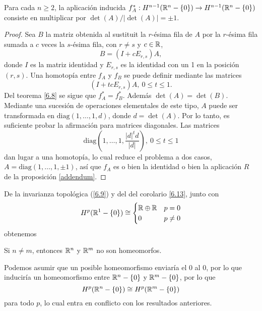 \documentclass[CV.tex]{subfiles}
\begin{document}
\begin{coro}\label{multiplica}
Para cada $n\geq 2$, la aplicación inducida $f_A^*:H^{n-1}(\mathbb{R}^n-\{0\})\to H^{n-1}(\mathbb{R}^n-\{0\})$ consiste en multiplicar por $\det(A)/|\det(A)|=\pm 1$.
\end{coro}
\begin{proof}
Sea $B$ la matriz obtenida al sustituit la $r$-ésima fila de $A$ por la $r$-ésima fila sumada a $c$ veces la $s$-ésima fila, con $r\neq s$ y $c\in\mathbb{R}$,
\[
B=(I+cE_{r,s})A,
\]
donde $I$ es la matriz identidad y $E_{r,s}$ es la identidad con un 1 en la posición $(r,s)$. Una homotopía entre $f_A$ y $f_B$ se puede definir mediante las matrices
\[
(I+tcE_{r,s})A,\ 0\leq t\leq 1.
\]
Del teorema \ref{6.8} se sigue que $f_A^*=f_B^*$. Además $\det(A)=\det(B)$. Mediante una sucesión de operaciones elementales de este tipo, $A$ puede ser transformada en $\mathrm{diag}(1,\dots, 1,d)$, donde $d=\det(A)$. Por lo tanto, es suficiente probar la afirmación para matrices diagonales. Las matrices
\[
\mathrm{diag}(1,\dots, 1, \frac{|d|^td}{|d|}),\ 0\leq t\leq 1
\]
dan lugar a una homotopía, lo cual reduce el problema a dos casos, $A=\mathrm{diag}(1,\dots, 1,\pm 1)$, así que $f_A$ es o bien la identidad o bien la aplicación $R$ de la proposición \ref{addendum}.
\end{proof}

De la invarianza topológica (\ref{6.9}) y del del corolario \ref{6.13}, junto con 
\[
H^p(\mathbb{R}^1-\{0\})\cong\begin{cases}
\mathbb{R}\oplus\mathbb{R} & p=0\\
0 & p\neq 0
\end{cases}
\]
obtenemos

\begin{prop}
Si $n\neq m$, entonces $\mathbb{R}^n$ y $\mathbb{R}^m$ no son homeomorfos. 
\end{prop}
\begin{dem}
Podemos asumir que un posible homeomorfismo enviaría el 0 al 0, por lo que induciría un homeomorfismo entre $\mathbb{R}^n-\{0\}$ y $\mathbb{R}^m-\{0\}$, por lo que
\[
H^p(\mathbb{R}^n-\{0\})\cong H^p(\mathbb{R}^m-\{0\})
\]
para todo $p$, lo cual entra en conflicto con los resultados anteriores.
\QED
\end{dem}
\end{document}
